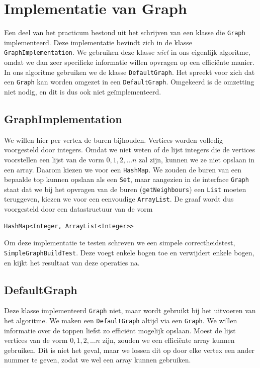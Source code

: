 \documentclass{article}
\begin{document}
\section{Implementatie van Graph}
Een deel van het practicum bestond uit het schrijven van een klasse die
\verb#Graph# implementeerd. Deze implementatie bevindt zich in de klasse
\verb#GraphImplementation#. We gebruiken deze klasse \emph{niet} in ons
eigenlijk algoritme, omdat we dan zeer specifieke informatie willen opvragen
op een effici\"ente manier. In ons algoritme gebruiken we de klasse
\verb#DefaultGraph#. Het spreekt voor zich dat een \verb#Graph# kan worden
omgezet in een \verb#DefaultGraph#. Omgekeerd is de omzetting niet nodig, en dit
is dus ook niet ge\"implementeerd.

\subsection{GraphImplementation}
We willen hier per vertex de buren bijhouden. Vertices worden volledig
voorgesteld door integers. Omdat we niet weten of de lijst integers die de
vertices voorstellen een lijst van de vorm $0, 1, 2, \dots n$ zal zijn,
kunnen we ze niet opslaan in een array. Daarom kiezen we voor een
\verb#HashMap#. We zouden de buren van een bepaalde top kunnen opslaan als een
\verb#Set#, maar aangezien in de interface \verb#Graph# staat dat we bij het
opvragen van de buren (\verb#getNeighbours#) een \verb#List# moeten teruggeven,
kiezen we voor een eenvoudige \verb#ArrayList#. De graaf wordt dus voorgesteld
door een datastructuur van de vorm
\begin{verbatim}
HashMap<Integer, ArrayList<Integer>>
\end{verbatim}

Om deze implementatie te testen schreven we een simpele correctheidstest,
\verb#SimpleGraphBuildTest#. Deze voegt enkele bogen toe en verwijdert enkele
bogen, en kijkt het resultaat van deze operaties na.

\subsection{DefaultGraph}
Deze klasse implementeerd \verb#Graph# niet, maar wordt gebruikt bij het
uitvoeren van het algoritme. We maken een \verb#DefaultGraph# altijd via een
\verb#Graph#. We willen informatie over de toppen liefst zo effici\"ent mogelijk
opslaan. Moest de lijst vertices van de vorm $0, 1, 2, \dots n$ zijn, zouden we
een effici\"ente array kunnen gebruiken. Dit is niet het geval, maar we lossen
dit op door elke vertex een ander nummer te geven, zodat we wel een array kunnen
gebruiken.
\newline
\end{document}
